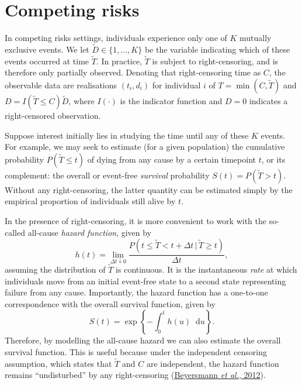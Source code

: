 \documentclass[
  letterpaper,
  DIV=11,
  numbers=noendperiod]{scrreprt}
\newcommand{\given}{\,|\,}
\newcommand\diff{\mathop{}\!\mathrm{d}}
\begin{document}
\hypertarget{sec-intro-comp-risks}{%
\section{Competing risks}\label{sec-intro-comp-risks}}

In competing risks settings, individuals experience only one of \(K\)
mutually exclusive events. We let \(\tilde{D} \in \{1,...,K\}\) be the
variable indicating which of these events occurred at time
\(\tilde{T}\). In practice, \(\tilde{T}\) is subject to right-censoring,
and is therefore only partially observed. Denoting that right-censoring
time as \(C\), the observable data are realisations \((t_i, d_i)\) for
individual \(i\) of \(T = \min(C,\tilde{T})\) and
\(D = I(\tilde{T} \leq C)\tilde{D}\), where \(I(\cdot)\) is the
indicator function and \(D = 0\) indicates a right-censored observation.

Suppose interest initially lies in studying the time until any of these
\(K\) events. For example, we may seek to estimate (for a given
population) the cumulative probability \(P(\tilde{T} \leq t)\) of dying
from any cause by a certain timepoint \(t\), or its complement: the
overall or event-free \emph{survival} probability
\(S(t) = P(\tilde{T} > t)\). Without any right-censoring, the latter
quantity can be estimated simply by the empirical proportion of
individuals still alive by \(t\).

In the presence of right-censoring, it is more convenient to work with
the so-called all-cause \emph{hazard function}, given by \[
    h(t) = \lim_{\Delta t \downarrow 0} \frac{P(t \leq \tilde{T} < t + \Delta t\given \tilde{T} \geq t)}{\Delta t},
\] assuming the distribution of \(\tilde{T}\) is continuous. It is the
instantaneous \emph{rate} at which individuals move from an initial
event-free state to a second state representing failure from any cause.
Importantly, the hazard function has a one-to-one correspondence with
the overall survival function, given by \[
  S(t) = \exp \left\{ - \int_{0}^{t} h(u)\diff u \right\}.
\] Therefore, by modelling the all-cause hazard we can also estimate the
overall survival function. This is useful because under the independent
censoring assumption, which states that \(\tilde{T}\) and \(C\) are
independent, the hazard function remains ``undisturbed'' by any
right-censoring
(\protect\hyperlink{ref-beyersmannCompetingRisksMultistate2012}{Beyersmann
\emph{et al.}, 2012}).
\end{document}
